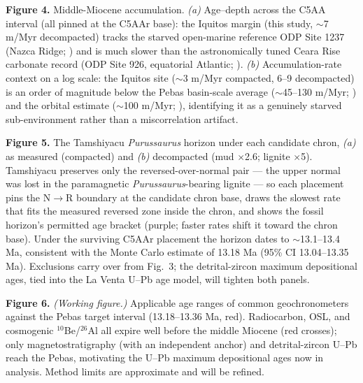\documentclass[12pt]{article}
\begin{document}
\textbf{Figure 4.} Middle-Miocene accumulation. \textit{(a)} Age--depth across the C5AA interval
(all pinned at the C5AAr base): the Iquitos margin (this study, $\sim$7 m/Myr decompacted) tracks
the starved open-marine reference ODP Site 1237 (Nazca Ridge; \citealp{Mix2003}) and is much slower
than the astronomically tuned Ceara Rise carbonate record (ODP Site 926, equatorial Atlantic;
\citealp{BackmanRaffi1997}). \textit{(b)} Accumulation-rate context on a log scale: the Iquitos
site ($\sim$3 m/Myr compacted, 6--9 decompacted) is an order of magnitude below the Pebas
basin-scale average ($\sim$45--130 m/Myr; \citealp{Hoorn2010}) and the orbital estimate
($\sim$100 m/Myr; \citealp{Hoorn2022}), identifying it as a genuinely starved sub-environment
rather than a miscorrelation artifact.

\textbf{Figure 5.} The Tamshiyacu \textit{Purussaurus} horizon under each candidate chron,
\textit{(a)} as measured (compacted) and \textit{(b)} decompacted (mud $\times$2.6; lignite
$\times$5). Tamshiyacu preserves only the reversed-over-normal pair --- the upper normal was
lost in the paramagnetic \textit{Purussaurus}-bearing lignite --- so each placement pins the
N$\rightarrow$R boundary at the candidate chron base, draws the slowest rate that fits the
measured reversed zone inside the chron, and shows the fossil horizon's permitted age bracket
(purple; faster rates shift it toward the chron base). Under the surviving C5AAr placement the
horizon dates to $\sim$13.1--13.4 Ma, consistent with the Monte Carlo estimate of 13.18 Ma
(95\% CI 13.04--13.35 Ma). Exclusions carry over from Fig.~3; the detrital-zircon maximum
depositional ages, tied into the La Venta U--Pb age model, will tighten both panels.

\textbf{Figure 6.} \textit{(Working figure.)} Applicable age ranges of common
geochronometers against the Pebas target interval (13.18--13.36 Ma, red). Radiocarbon, OSL,
and cosmogenic $^{10}$Be/$^{26}$Al all expire well before the middle Miocene (red crosses);
only magnetostratigraphy (with an independent anchor) and detrital-zircon U--Pb reach the
Pebas, motivating the U--Pb maximum depositional ages now in analysis. Method limits are
approximate and will be refined.
\end{document}
